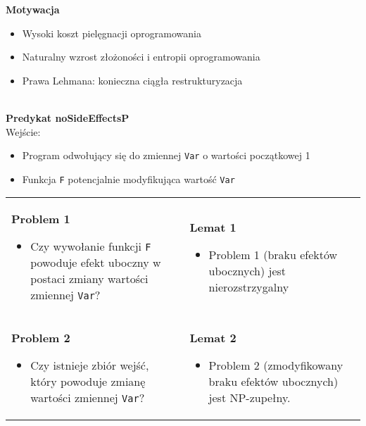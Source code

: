 \documentclass[../main.tex]{subfiles}
\begin{document}
    \textbf{Motywacja}
    \begin{itemize}
        \item Wysoki koszt pielęgnacji oprogramowania
        \item Naturalny wzrost złożoności i entropii
        oprogramowania
        \item Prawa Lehmana: konieczna ciągła restrukturyzacja
    \end{itemize}

    \hfill \\

    \textbf{Predykat noSideEffectsP}\\
    Wejście:
    \begin{itemize}
        \item Program odwołujący się do zmiennej \texttt{Var} o wartości początkowej 1
        \item Funkcja \texttt{F} potencjalnie modyfikująca wartość \texttt{Var}
    \end{itemize}


    \begin{table}[H]
        \begin{center}
            \begin{tabular}{ p{8cm} p{8cm} }
                \textbf{Problem 1}
                \begin{itemize}
                    \item Czy wywołanie funkcji \texttt{F} powoduje efekt uboczny w
                    postaci zmiany wartości zmiennej \texttt{Var}?
                \end{itemize}
                &
                \textbf{Lemat 1}
                \begin{itemize}
                    \item Problem 1 (braku efektów ubocznych) jest
                    nierozstrzygalny
                \end{itemize}
                \\

                \textbf{Problem 2}
                \begin{itemize}
                    \item Czy istnieje zbiór wejść, który powoduje zmianę
                    wartości zmiennej \texttt{Var}?
                \end{itemize}
                &
                \textbf{Lemat 2}
                \begin{itemize}
                    \item Problem 2 (zmodyfikowany braku efektów
                    ubocznych) jest NP-zupełny.
                \end{itemize}
                \\
            \end{tabular}
        \end{center}
    \end{table}
\end{document}
